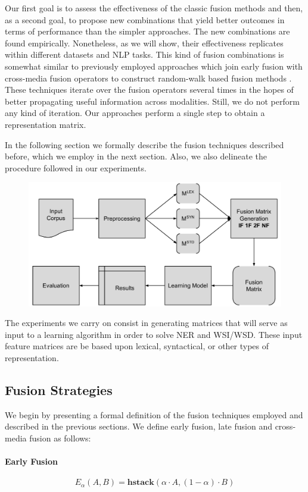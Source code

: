 \documentclass{llncs}
\begin{document}
Our first goal is to assess the effectiveness of the classic fusion methods and then, as a second goal, to propose new combinations that yield better outcomes in terms of performance than the simpler approaches. The new combinations are found empirically. Nonetheless, as we will show, their effectiveness replicates within different datasets and NLP tasks. This kind of fusion combinations is somewhat similar to previously employed approaches which join early fusion with cross-media fusion operators to construct random-walk based fusion methods \cite{Ah-PineCC15,GialampoukidisM16}. These techniques iterate over the fusion operators several times in the hopes of better propagating useful information across modalities. Still, we do not perform any kind of iteration. Our approaches perform a single step to obtain a representation matrix.

In the following section we formally describe the fusion techniques described before, which we employ in the next section. Also, we also delineate the procedure followed in our experiments. 

\begin{figure}[t]
\centering
\includegraphics[width=0.85\linewidth]{img/diag_metodo}
\caption{}
\label{fig:diagmetodo}
\end{figure}

The experiments we carry on consist in generating matrices that will serve as input to a learning algorithm in order to solve NER and WSI/WSD. These input feature matrices are be based upon lexical, syntactical, or other types of representation. 

\subsection{Fusion Strategies}
We begin by presenting a  formal definition of the fusion techniques employed and described in the previous sections. We define early fusion, late fusion and cross-media fusion as follows:
\paragraph{Early Fusion}
\begin{equation}
E_\alpha(A,B) = \mathbf{hstack}(\alpha\cdot A , (1-\alpha)\cdot B)
\end{equation}
\end{document}
